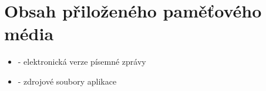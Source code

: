 
\chapter{Obsah přiloženého paměťového média}
    \begin{itemize}
        \item {} - elektronická verze písemné zprávy
        \item {} - zdrojové soubory aplikace        
    \end{itemize}



